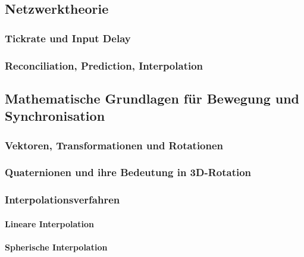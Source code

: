 \documentclass{article}
\begin{document}
\subsection{Netzwerktheorie}
\subsubsection{Tickrate und Input Delay}
\subsubsection{Reconciliation, Prediction, Interpolation}
\subsection{Mathematische Grundlagen für Bewegung und Synchronisation}
\subsubsection{Vektoren, Transformationen und Rotationen}
\subsubsection{Quaternionen und ihre Bedeutung in 3D-Rotation}
\subsubsection{Interpolationsverfahren}
\paragraph{Lineare Interpolation}
\paragraph{Spherische Interpolation}
\end{document}
